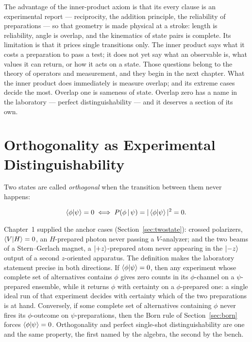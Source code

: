 The advantage of the inner-product axiom is that its every clause is an experimental report --- reciprocity, the addition principle, the reliability of preparations --- so that geometry is made physical at a stroke: length is reliability, angle is overlap, and the kinematics of state pairs is complete. Its limitation is that it prices single transitions only. The inner product says what it costs a preparation to pass a test; it does not yet say what an observable is, what values it can return, or how it acts on a state. Those questions belong to the theory of operators and measurement, and they begin in the next chapter. What the inner product does immediately is measure overlap; and its extreme cases decide the most. Overlap one is sameness of state. Overlap zero has a name in the laboratory --- perfect distinguishability --- and it deserves a section of its own.

\section{Orthogonality as Experimental Distinguishability}
\label{sec:orthogonality}

Two states are called \emph{orthogonal} when the transition between them never happens:
\begin{linenomath}
\begin{equation}
    \braket{\phi|\psi}=0
    \iff
    P(\phi\,|\,\psi)=|\braket{\phi|\psi}|^2=0 .
    \label{eq:orthogonality-iff}
\end{equation}
\end{linenomath}
Chapter~1 supplied the anchor cases (Section~\ref{sec:twostate}): crossed polarizers, $\braket{V|H}=0$, an $H$-prepared photon never passing a $V$-analyzer; and the two beams of a Stern--Gerlach magnet, a $\ket{+z}$-prepared atom never appearing in the $\ket{-z}$ output of a second $z$-oriented apparatus. The definition makes the laboratory statement precise in both directions. If $\braket{\phi|\psi}=0$, then any experiment whose complete set of alternatives contains $\phi$ gives zero counts in its $\phi$-channel on a $\psi$-prepared ensemble, while it returns $\phi$ with certainty on a $\phi$-prepared one: a single ideal run of that experiment decides with certainty which of the two preparations is at hand. Conversely, if some complete set of alternatives containing $\phi$ never fires its $\phi$-outcome on $\psi$-preparations, then the Born rule of Section~\ref{sec:born} forces $\braket{\phi|\psi}=0$. Orthogonality and perfect single-shot distinguishability are one and the same property, the first named by the algebra, the second by the bench.

